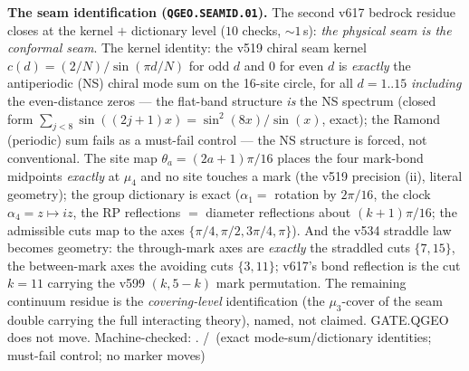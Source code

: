 \par\smallskip\noindent\textbf{The seam identification
(\texttt{QGEO.SEAMID.01}).}
The second v617 bedrock residue closes at the kernel $+$ dictionary
level ($10$ checks, ${\sim}1$\,s): \emph{the physical seam is the
conformal seam}.  The kernel identity: the v519 chiral seam kernel
$c(d)=(2/N)/\sin(\pi d/N)$ for odd $d$ and $0$ for even $d$ is
\emph{exactly} the antiperiodic (NS) chiral mode sum on the 16-site
circle, for all $d=1..15$ \emph{including} the even-distance zeros
--- the flat-band structure \emph{is} the NS spectrum (closed form
$\sum_{j<8}\sin((2j{+}1)x)=\sin^2(8x)/\sin(x)$, exact); the Ramond
(periodic) sum fails as a must-fail control --- the NS structure is
forced, not conventional.  The site map $\theta_a=(2a{+}1)\pi/16$
places the four mark-bond midpoints \emph{exactly} at $\mu_4$ and no
site touches a mark (the v519 precision (ii), literal geometry); the
group dictionary is exact ($\alpha_1=$ rotation by $2\pi/16$, the
clock $\alpha_4=z\mapsto iz$, the RP reflections $=$ diameter
reflections about $(k{+}1)\pi/16$; the admissible cuts map to the
axes $\{\pi/4,\pi/2,3\pi/4,\pi\}$).  And the v534 straddle law
becomes geometry: the through-mark axes are \emph{exactly} the
straddled cuts $\{7,15\}$, the between-mark axes the avoiding cuts
$\{3,11\}$; v617's bond reflection is the cut $k=11$ carrying the
v599 $(k,5{-}k)$ mark permutation.  The remaining continuum residue
is the \emph{covering-level} identification (the $\mu_3$-cover of
the seam double carrying the full interacting theory), named, not
claimed.  GATE.QGEO does not move.
Machine-checked: .
\mE/\mC\ (exact mode-sum/dictionary identities; must-fail control;
no marker moves)
\par\smallskip

